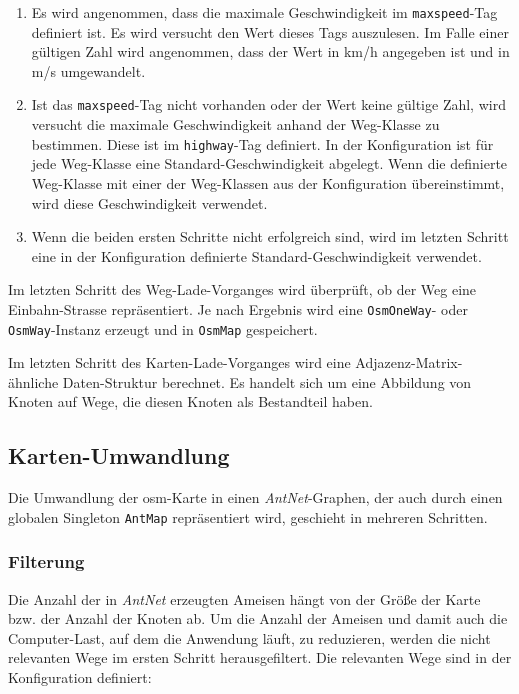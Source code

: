 \begin{enumerate}
  \item Es wird angenommen, dass die maximale Geschwindigkeit im \texttt{maxspeed}-Tag definiert ist.
    Es wird versucht den Wert dieses Tags auszulesen.
    Im Falle einer gültigen Zahl wird angenommen, dass der Wert in km/h angegeben ist und in m/s umgewandelt.
  \item Ist das \texttt{maxspeed}-Tag nicht vorhanden oder der Wert keine gültige Zahl, wird versucht die maximale Geschwindigkeit anhand der Weg-Klasse zu bestimmen.
    Diese ist im \texttt{highway}-Tag definiert.
    In der Konfiguration ist für jede Weg-Klasse eine Standard-Geschwindigkeit abgelegt.
    Wenn die definierte Weg-Klasse mit einer der Weg-Klassen aus der Konfiguration übereinstimmt, wird diese Geschwindigkeit verwendet.
  \item Wenn die beiden ersten Schritte nicht erfolgreich sind, wird im letzten Schritt eine in der Konfiguration definierte Standard-Geschwindigkeit verwendet.
\end{enumerate}

Im letzten Schritt des Weg-Lade-Vorganges wird überprüft, ob der Weg eine Einbahn-Strasse repräsentiert.
Je nach Ergebnis wird eine \texttt{OsmOneWay}- oder \texttt{OsmWay}-Instanz erzeugt und in \texttt{OsmMap} gespeichert.

Im letzten Schritt des Karten-Lade-Vorganges wird eine Adjazenz-Matrix-ähnliche Daten-Struktur berechnet.
Es handelt sich um eine Abbildung von Knoten auf Wege, die diesen Knoten als Bestandteil haben.

\subsection{Karten-Umwandlung}
\label{sec:karten-umwandlung}

Die Umwandlung der \gls{osm}-Karte in einen \textit{AntNet}-Graphen, der auch durch einen globalen Singleton \texttt{AntMap} repräsentiert wird, geschieht in mehreren Schritten.

\subsubsection{Filterung}
\label{sec:filterung}

Die Anzahl der in \textit{AntNet} erzeugten Ameisen hängt von der Größe der Karte bzw. der Anzahl der Knoten ab.
Um die Anzahl der Ameisen und damit auch die Computer-Last, auf dem die Anwendung läuft, zu reduzieren, werden die nicht relevanten Wege im ersten Schritt herausgefiltert.
Die relevanten Wege sind in der Konfiguration definiert:

